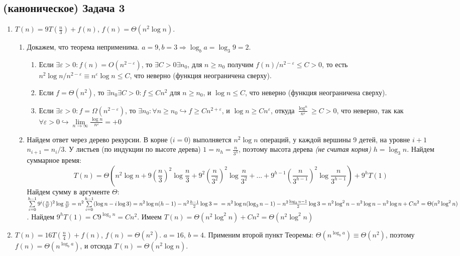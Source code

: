 \documentclass[a4paper]{article}
\def\eps{\varepsilon}
\begin{document}
\subsection*{(каноническое) Задача 3}
\begin{enumerate}
\item $T(n)=9T(\frac{n}{3})+f(n)$, $f(n)=\Theta(n^2\log n)$.
\begin{enumerate}
\item Докажем, что теорема неприменима. $a=9,b=3\Rightarrow \log_b a=\log_3 9=2$.
\begin{enumerate}
\item Если $\exists \eps>0\colon f(n)=O(n^{2-\eps})$, то $\exists C>0\exists n_0$, для $n\geqslant n_0$ получим $f(n)/n^{2-\varepsilon}\leqslant C>0$, то есть $n^2\log n/n^{2-\eps}\equiv n^\varepsilon\log n\leqslant C$, что неверно (функция неограничена сверху).
\item Если $f=\Theta(n^2)$, то $\exists n_0\exists C>0\colon f\leqslant Cn^2$ для $n\geqslant n_0$, и $\log n\leqslant C$, что неверно (функция неограничена сверху).
\item Если $\exists \eps>0\colon f=\Omega(n^{2-\eps})$, то $\exists n_0\colon\forall n\geqslant n_0\hookrightarrow f\geqslant Cn^{2+\eps}$, и $\log n\geqslant Cn^\eps$, откуда $\frac{\log^n}{n^\eps}\geqslant C>0$, что неверно, так как $\forall\eps>0\hookrightarrow\lim\limits_{n\to\infty}\frac{\log n}{n^\eps}=+0$
\end{enumerate}
\item Найдем ответ через дерево рекурсии. В корне ($i=0$) выполняется $n^2\log n$ операций, у каждой вершины 9 детей, на уровне $i+1$ $n_{i+1}=n_i/3$. У листьев (по индукции по высоте дерева) $1=n_h=\frac{n}{3^h}$, поэтому высота дерева {\em (не считая корня)} $h=\log_3n$. Найдем суммарное время:
$$T(n)=\Theta(n^2\log n+9(\frac{n}{3})^2\log\frac{n}{3}+9^2(\frac{n}{3^2})^2\log\frac{n}{3^2}+...+9^{h-1}(\frac{n}{3^{h-1}})^2\log\frac{n}{3^{h-1}})+9^hT(1)$$
Найдем сумму в аргументе $\Theta$: $\sum\limits_{i=0}^{h-1}9^i(\frac{n}{3^i})^2\log\frac{n}{3^i}=n^2\sum\limits_{i=0}^{h-1}(\log n-i\log 3)=n^2\log n(h-1)-n^2\frac{h-1}{2}\log 3=\newline=n^2\log n(\log_3n-1)-n^2\frac{\log_3n-1}{2}\log 3=n^2\log^2n-n^2\log n-n^2\log n+Cn^2=\Theta(n^2\log^2 n)$.\newline
Найдем $9^hT(1)=C9^{\log_3 n}=Cn^2$. Имеем $T(n)=\Theta(n^2\log^2n)+Cn^2=\boxed{\Theta(n^2\log^2n)}$
\end{enumerate}
\item $T(n)=16T(\frac{n}{4})+f(n)$, $f(n)=\Theta(n^2)$. $a=16,\,b=4$. Применим второй пункт Теоремы: $\Theta(n^{\log_b a})\equiv\Theta(n^2)$, поэтому $f(n)=\Theta(n^{\log_b a})$, и отсюда $T(n)=\boxed{\Theta(n^2\log n)}$.

\end{enumerate}
\end{document}
